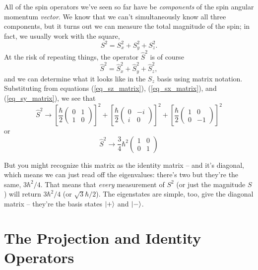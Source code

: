 All of the spin operators we've seen so far have be \emph{components} of the spin angular momentum \emph{vector}.  We know that we can't simultaneously know all three components, but it turns out we can measure the total magnitude of the spin; in fact, we usually work with the square,
\begin{equation}
S^2 = S_x^2 + S_y^2 + S_z^2.
\end{equation}
At the risk of repeating things, the operator $\hat{S}^2$ is of course
\begin{equation}
\hat{S}^2 = \hat{S}_x^2 + \hat{S}_y^2 + \hat{S}_z^2,
\end{equation}
and we can determine what it looks like in the $S_z$ basis using matrix notation.  Substituting from equations (\ref{eq_sz_matrix}), (\ref{eq_sx_matrix}), and (\ref{eq_sy_matrix}), we see that
\begin{equation}
\hat{S}^2 \to \left[ \frac{\hbar}{2} \begin{pmatrix} 0 & 1 \\ 1 & 0 \end{pmatrix} \right]^2 + 
\left[ \frac{\hbar}{2} \begin{pmatrix} 0 & -i \\ i & 0 \end{pmatrix} \right]^2 + 
\left[ \frac{\hbar}{2} \begin{pmatrix} 1 & 0 \\ 0 & -1 \end{pmatrix} \right]^2
\end{equation}
or
\begin{equation}
\hat{S}^2 \to \frac{3}{4} \hbar^2 \begin{pmatrix} 1 & 0 \\ 0 & 1 \end{pmatrix} 
\end{equation}

But you might recognize this matrix as the identity matrix -- and it's diagonal, which means we can just read off the eigenvalues:  there's two but they're the same, $3\hbar^2/4$.  That means that \emph{every} measurement of $S^2$ (or just the magnitude $S$) will return $3\hbar^2/4$ (or $\sqrt{3} \hbar /2$).  The eigenstates are simple, too, give the diagonal matrix -- they're the basis states $| + \rangle$ and $| - \rangle$.

\section{The Projection and Identity Operators}

